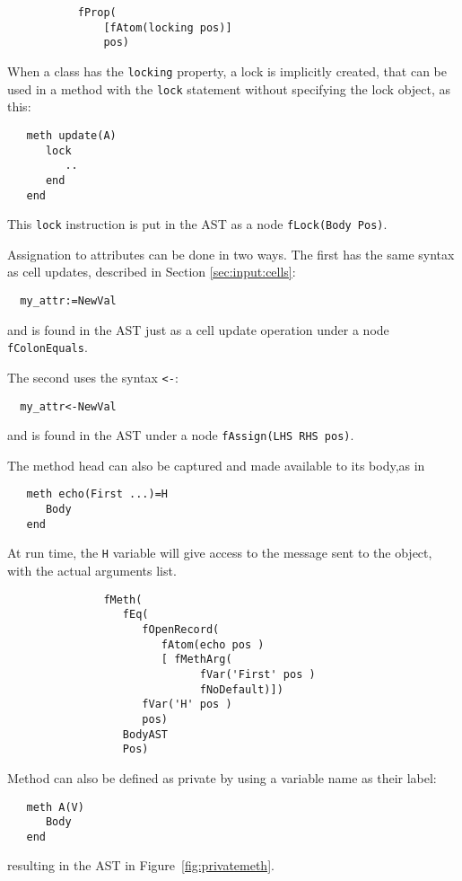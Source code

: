 \documentclass[a4paper]{memoir}
\begin{document}
\begin{lstlisting}
           fProp(
               [fAtom(locking pos)]
               pos)
\end{lstlisting}

When a class has the \lstinline!locking! property, a lock is implicitly created,
that can be used in a method with the \lstinline!lock! statement without
specifying the lock object, as this:

\begin{lstlisting}
   meth update(A)
      lock
         ..
      end
   end
\end{lstlisting}

This \lstinline!lock! instruction is put in the AST as a node
\lstinline!fLock(Body Pos)!. 

Assignation to attributes can be done in two ways. The first has the same syntax
as cell updates, described in Section \ref{sec:input:cells}:
\begin{lstlisting}
  my_attr:=NewVal
\end{lstlisting}
and is found in the AST just as a cell update operation under a node
\lstinline!fColonEquals!.

The second uses the syntax \lstinline!<-!:
\begin{lstlisting}
  my_attr<-NewVal
\end{lstlisting}
and is found in the AST under a node \lstinline!fAssign(LHS RHS pos)!.

\label{compilerinput:classes:headcapture}The method head can also be captured and made available to its body,as in 
\begin{lstlisting}
   meth echo(First ...)=H
      Body
   end  
\end{lstlisting}
At run time, the \lstinline!H! variable will give access to the message sent to the object, with the actual arguments list.
\begin{lstlisting}
               fMeth(
                  fEq(
                     fOpenRecord(
                        fAtom(echo pos )
                        [ fMethArg(
                              fVar('First' pos )
                              fNoDefault)])
                     fVar('H' pos )
                     pos)
                  BodyAST
                  Pos)
\end{lstlisting}

Method can also be defined as private by using a variable name as their label:
\begin{lstlisting}
   meth A(V)
      Body
   end
\end{lstlisting}
resulting in the AST in Figure~\ref{fig:privatemeth}.
\end{document}
